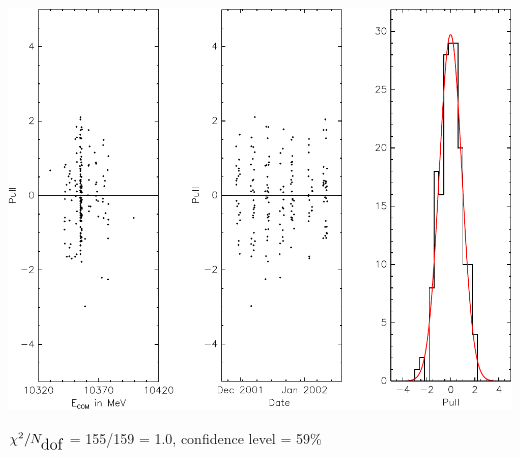 \documentclass[landscape]{article}
\newcommand{\subs}[1]{{\mbox{\large #1}}}
\begin{document}
\begin{slide:fitting}

\begin{center}
\includegraphics[width=0.8\linewidth]{plots/pulls3}
\end{center}

$\chi^2/N_\subs{dof}$ = 155/159 = 1.0, confidence level = 59\%

\end{slide:fitting}
\end{document}
